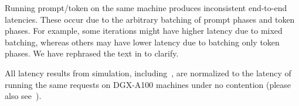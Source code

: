 Running prompt/token on the same machine produces inconsistent end-to-end latencies.
These occur due to the arbitrary batching of prompt phases and token phases.
For example, some iterations might have higher latency due to mixed batching, whereas others may have lower latency due to batching only token phases.
We have rephrased the text in  to clarify.

All latency results from simulation, including~, are normalized to the latency of running the same requests on DGX-A100 machines under no contention (please also see~).


